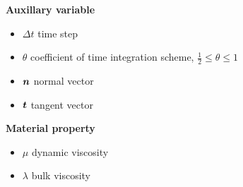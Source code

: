 \documentclass[11pt]{article}
\def\bbf#1{\mathchoice{\hbox{\boldmath$\displaystyle#1$}}
{\hbox{\boldmath$\textstyle#1$}} {\hbox{\boldmath$\scriptstyle#1$}} {\hbox{\boldmath$\scriptscriptstyle#1$}} }
\newcommand{\n}{\bbf{n}}
\renewcommand{\t}{\bbf{t}}
\begin{document}
{\large \bf Auxillary variable} %
\begin{itemize}
    \item $\Delta t$ time step
    \item $\theta$ coefficient of time integration scheme, $\frac{1}{2} \le \theta \le 1$
    \item $\n$ normal vector
    \item $\t$ tangent vector
\end{itemize}
{\large \bf Material property} %
\begin{itemize}
\item $\mu$ dynamic viscosity
\item $\lambda$ bulk viscosity
\end{itemize}
\end{document}
